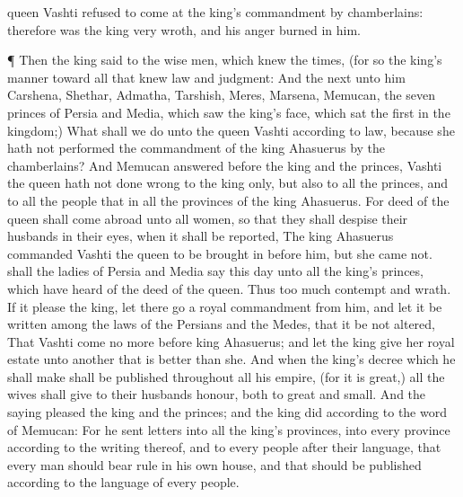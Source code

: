 {queen
Vashti
refused to
come at the
king’s
commandment
by
{}
chamberlains: therefore was the
king
very
wroth, and his
anger
burned in him.
\par }{\PP {}¶ Then the
king
said to the wise
men, which
knew the
times, (for so
{} the
king’s
manner
toward all that
knew
law and
judgment:
And the
next unto him
{}
Carshena,
Shethar,
Admatha,
Tarshish,
Meres,
Marsena,
{}
Memucan, the
seven
princes of
Persia and
Media, which
saw the
king’s
face,
{} which
sat the
first in the
kingdom;)
What shall we
do unto the
queen
Vashti according to
law, because she hath not
performed the
commandment of the
king
Ahasuerus
by the
chamberlains?
And
Memucan
answered
before the
king and the
princes,
Vashti the
queen hath not done
wrong to the
king only, but also to all the
princes, and to all the
people that
{} in all the
provinces of the
king
Ahasuerus.
For
{}
deed of the
queen shall come
abroad unto all
women, so that they shall
despise their
husbands in their
eyes, when it shall be
reported, The
king
Ahasuerus
commanded
Vashti the
queen to be brought
in
before him, but she
came not.
 shall the
ladies of
Persia and
Media
say this
day unto all the
king’s
princes, which have
heard of the
deed of the
queen. Thus
{} too
much
contempt and
wrath.
If it
please the
king, let there
go a
royal
commandment from
him, and let it be
written among the
laws of the
Persians and the
Medes, that it be not
altered, That
Vashti
come no more
before
king
Ahasuerus; and let the
king
give her royal
estate unto
another that is
better than she.
And when the
king’s
decree which he shall
make shall be
published throughout all his
empire, (for it is
great,) all the
wives shall
give to their
husbands
honour, both to
great and
small.
And the
saying
pleased the
king and the
princes; and the
king
did according to the
word of
Memucan:
For he
sent
letters into all the
king’s
provinces, into every
province according to the
writing thereof, and to every
people after their
language, that every
man should bear
rule in his own
house, and that
{} should be
published according to the
language of every
people.

}
